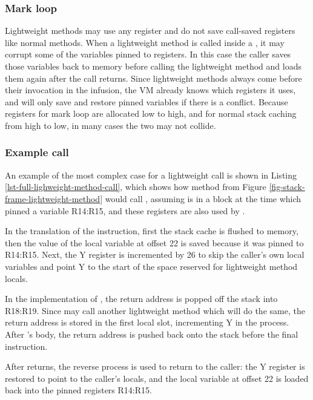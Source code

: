 \subsubsection{Mark loop}
Lightweight methods may use any register and do not save call-saved registers like normal methods. When a lightweight method is called inside a , it may corrupt some of the variables pinned to registers. In this case the caller saves those variables back to memory before calling the lightweight method and loads them again after the call returns. Since lightweight methods always come before their invocation in the infusion, the VM already knows which registers it uses, and will only save and restore pinned variables if there is a conflict. Because registers for mark loop are allocated low to high, and for normal stack caching from high to low, in many cases the two may not collide.

\subsubsection{Example call}
An example of the most complex case for a lightweight call is shown in Listing \ref{lst-full-lighweight-method-call}, which shows how method  from Figure \ref{fig-stack-frame-lightweight-method} would call , assuming  is in a  block at the time which pinned a variable R14:R15, and these registers are also used by .

In the translation of the  instruction, first the stack cache is flushed to memory, then the value of the local variable at offset 22 is saved because it was pinned to R14:R15. Next, the Y register is incremented by 26 to skip the caller's own local variables and point Y to the start of the space reserved for lightweight method locals.

In the implementation of , the return address is popped off the stack into R18:R19. Since  may call another lightweight method which will do the same, the return address is stored in the first local slot, incrementing Y in the process. After 's body, the return address is pushed back onto the stack before the final  instruction.

After  returns, the reverse process is used to return to the caller: the Y register is restored to point to the caller's locals, and the local variable at offset 22 is loaded back into the pinned registers R14:R15.

